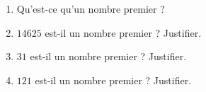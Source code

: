 \begin{minipage}{0.99\linewidth}

\exo



\begin{enumerate}

\item Qu'est-ce qu'un nombre premier ?

\item $14 625$ est-il un nombre premier ? Justifier.

\item $31$ est-il un nombre premier ? Justifier.

\item $121$ est-il un nombre premier ? Justifier.

\end{enumerate}

\end{minipage}

\vspace{0.5cm}
